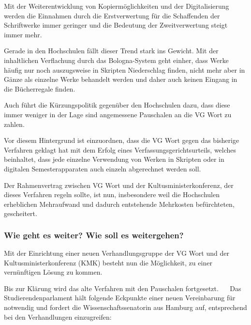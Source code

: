 \documentclass[ngerman,headheight=70pt]{scrartcl}
\begin{document}
    Mit der Weiterentwicklung von Kopiermöglichkeiten und der Digitalisierung
    werden die Einnahmen durch die Erstverwertung für die Schaffenden der
    Schriftwerke immer geringer und die Bedeutung der Zweitverwertung steigt immer
    mehr.

    Gerade in den Hochschulen fällt dieser Trend stark ins Gewicht. Mit der
    inhaltlichen Verflachung durch das Bologna-System geht einher, dass Werke
    häufig nur noch auszugsweise in Skripten Niederschlag finden, nicht mehr aber
    in Gänze als einzelne Werke behandelt werden und daher auch keinen Eingang in
    die Bücherregale finden.

    Auch führt die Kürzungspolitik gegenüber den Hochschulen dazu, dass diese
    immer weniger in der Lage sind angemessene Pauschalen an die VG Wort zu zahlen.

    Vor diesem Hintergrund ist einzuordnen, dass die VG Wort gegen das bisherige
    Verfahren geklagt hat mit dem Erfolg eines Verfassungsgerichtsurteils, welches
    beinhaltet, dass jede einzelne Verwendung von Werken in Skripten oder in
    digitalen Semesterapparaten auch einzeln abgerechnet werden soll.

    Der Rahmenvertrag zwischen VG Wort und der Kultusministerkonferenz, der dieses
    Verfahren regeln sollte, ist nun, insbesondere weil die
    Hochschulen erheblichen Mehraufwand und dadurch entstehende Mehrkosten
    befürchteten, gescheitert.

    \subsubsection*{Wie geht es weiter? Wie soll es weitergehen?}

    Mit der Einrichtung einer neuen Verhandlungsgruppe der VG Wort und der
    Kultusministerkonferenz (KMK) besteht nun die Möglichkeit, zu einer vernünftigen
    Lösung zu kommen.

    Bis zur Klärung wird das alte Verfahren mit den Pauschalen fortgesetzt.
 
    Das Studierendenparlament hält folgende Eckpunkte einer neuen Vereinbarung
    für notwendig und fordert die Wissenschaftssenatorin aus Hamburg auf,
    entsprechend bei den Verhandlungen einzugreifen:
\end{document}
